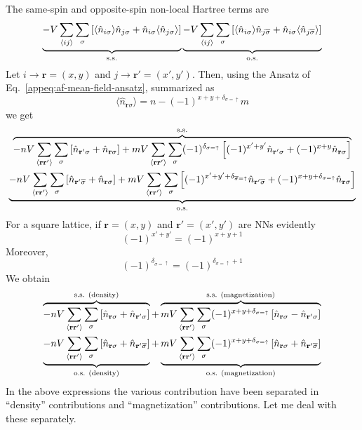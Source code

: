 The same-spin and opposite-spin non-local Hartree terms are
\[
	\underbrace{
		-V \sum_{\ev{ij}} \sum_\sigma \left[
			\langle 
				\hat n_{i\sigma}
			\rangle \hat n_{j\sigma} + \hat n_{i\sigma} \langle 
				\hat n_{j\sigma}
			\rangle
		\right]
	}_{\mathrm{s.s.}}
	\underbrace{
		-V \sum_{\ev{ij}} \sum_\sigma \left[
			\langle
				\hat n_{i\sigma}
			\rangle \hat n_{j\overline{\sigma}} + \hat n_{i\sigma} \langle 
				\hat n_{j\overline{\sigma}}
			\rangle
		\right]
	}_{\mathrm{o.s.}}
\]
Let $i \to \mathbf{r} = (x,y)$ and $j \to \mathbf{r}' = (x',y')$. Then, using the Ansatz of Eq.~\ref{appeq:af-mean-field-ansatz}, summarized as
\[
	\langle \hat n_{\mathbf{r}\sigma} \rangle = n - (-1)^{x+y+\delta_{\sigma=\uparrow}} m
\]
we get
\begin{multline*}
	\overbrace{
		-nV \sum_{\ev{\mathbf{r}\mathbf{r}'}} \sum_\sigma \left[
			\hat n_{\mathbf{r}'\sigma} + \hat n_{\mathbf{r}\sigma}
		\right] + mV \sum_{\ev{\mathbf{r}\mathbf{r}'}} \sum_\sigma (-1)^{\delta_{\sigma=\uparrow}} \left[
			(-1)^{x'+y'} \hat n_{\mathbf{r}'\sigma} + (-1)^{x+y} \hat n_{\mathbf{r}\sigma}
		\right]
	}^{\mathrm{s.s.}} \\
	\underbrace{
		-nV \sum_{\ev{\mathbf{r}\mathbf{r}'}} \sum_\sigma \left[
			\hat n_{\mathbf{r}'\overline{\sigma}} + \hat n_{\mathbf{r}\sigma}
		\right] + mV \sum_{\ev{\mathbf{r}\mathbf{r}'}} \sum_\sigma \left[
			(-1)^{x'+y'+\delta_{\overline{\sigma}=\uparrow}} \hat n_{\mathbf{r}'\overline{\sigma}} + (-1)^{x+y+\delta_{\sigma=\uparrow}} \hat n_{\mathbf{r}\sigma}
		\right]
	}_{\mathrm{o.s.}}
\end{multline*}
For a square lattice, if $\mathbf{r} = (x,y)$ and $\mathbf{r}' = (x',y')$ are NNs evidently
\[
	(-1)^{x'+y'} = (-1)^{x+y+1}
\]
Moreover,
\[
	(-1)^{\delta_{\overline{\sigma}=\uparrow}} = (-1)^{\delta_{\sigma=\uparrow}+1}
\]
We obtain
\begin{multline}
	\overbrace{
		-nV \sum_{\ev{\mathbf{r}\mathbf{r}'}} \sum_\sigma \left[
			\hat n_{\mathbf{r}\sigma} + \hat n_{\mathbf{r}'\sigma}
		\right]
	}^{\text{s.s. (density)}} + \overbrace{
		mV \sum_{\ev{\mathbf{r}\mathbf{r}'}} \sum_\sigma (-1)^{x+y+\delta_{\sigma=\uparrow}} \left[
			\hat n_{\mathbf{r}\sigma} - \hat n_{\mathbf{r}'\sigma}
		\right]
	}^{\text{s.s. (magnetization)}} \\
	\underbrace{
		-nV \sum_{\ev{\mathbf{r}\mathbf{r}'}} \sum_\sigma \left[
			\hat n_{\mathbf{r}\sigma} + \hat n_{\mathbf{r}'\overline{\sigma}}
		\right]
	}_{\text{o.s. (density)}} + \underbrace{
		mV \sum_{\ev{\mathbf{r}\mathbf{r}'}} \sum_\sigma (-1)^{x+y+\delta_{\sigma=\uparrow}} \left[
			\hat n_{\mathbf{r}\sigma} + \hat n_{\mathbf{r}'\overline{\sigma}}
		\right]
	}_{\text{o.s. (magnetization)}}
	\label{eq:af-hartree-renormalization-intermediate}
\end{multline}
In the above expressions the various contribution have been separated in ``density'' contributions and ``magnetization'' contributions. Let me deal with these separately.

